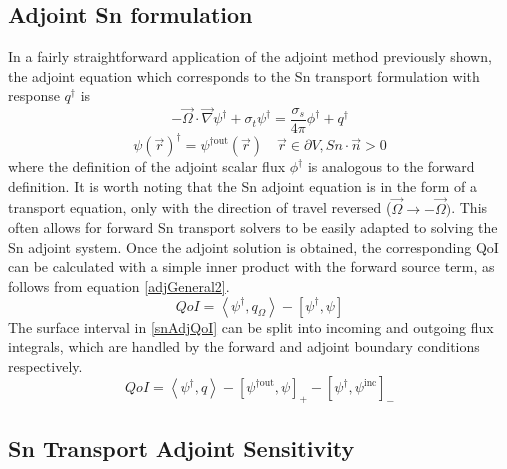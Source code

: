 \documentclass{article}
\newcommand{\vr}{\vec{r}}
\newcommand{\vO}{\vec{\Omega}}
\newcommand{\bra}{\left\langle}
\newcommand{\ket}{\right\rangle}
\newcommand{\sbra}{\left[}
\newcommand{\sket}{\right]}
\newcommand{\vgrad}{\vec{\nabla}}
\newcommand{\bound}{\partial V}
\newcommand{\sigt}{\sigma_t}
\newcommand{\sigs}{\sigma_s}
\newcommand{\angSource}{q_\Omega}
\newcommand{\angResp}{q^\dag}
\begin{document}
\subsection{Adjoint Sn formulation}
In a fairly straightforward application of the adjoint method previously shown, the adjoint equation which corresponds to the Sn transport formulation with response $\angResp$ is
\begin{equation}
\label{snAdj}
- \vO \cdot \vgrad \psi^\dag + \sigt \psi^\dag = \frac{\sigs}{4 \pi} \phi^\dag + \angResp
\end{equation}
%
\begin{equation}
\psi(\vr)^\dag = \psi^{\dag \text{out}}(\vr) \quad \vr \in \bound , Sn \cdot \vec{n} > 0
\end{equation}
where the definition of the adjoint scalar flux $\phi^\dag$ is analogous to the forward definition. It is worth noting that the Sn adjoint equation is in the form of a transport equation, only with the direction of travel reversed ($\vO \to -\vO)$. This often allows for forward Sn transport solvers to be easily adapted to solving the Sn adjoint system. Once the adjoint solution is obtained, the corresponding QoI can be calculated with a simple inner product with the forward source term, as follows from equation \ref{adjGeneral2}. 
%
\begin{equation}
\label{snAdjQoI}
QoI = \bra \psi^\dag , \angSource \ket - \sbra \psi^\dag,  \psi \sket
\end{equation}
%
The surface interval in \ref{snAdjQoI} can be split into incoming and outgoing flux integrals, which are handled by the forward and adjoint boundary conditions respectively. 
%
\begin{equation}
QoI = \bra \psi^\dag , q \ket - \sbra \psi^{\dag \text{out}},  \psi \sket_+ - \sbra \psi^\dag,  \psi^{\text{inc}} \sket_-
\end{equation}

\subsection{Sn Transport Adjoint Sensitivity}
\end{document}
